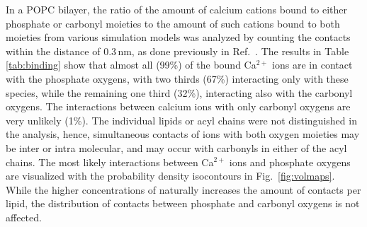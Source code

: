 \documentclass[aip,jcp,twocolumn]{revtex4}
\begin{document}
In a POPC bilayer, the ratio of the amount of calcium cations 
bound to either phosphate or carbonyl moieties 
to the amount of such cations bound to both moieties
from various simulation models
was analyzed by counting the contacts within the distance of $0.3 \, \mathrm{nm}$, 
as done previously in Ref.~. 
%
%
%
The results in Table \ref{tab:binding} show that almost all (99\%) of the 
bound Ca$^{2+}$ ions are in contact with the phosphate oxygens,
with two thirds (67\%) interacting only with these species,
while the remaining one third (32\%), interacting also with the carbonyl oxygens. 
The interactions between
calcium ions with only carbonyl oxygens are very unlikely (1\%).
The individual lipids or acyl chains were not distinguished in the analysis,
hence, simultaneous contacts of ions with both oxygen moieties may be inter or intra molecular,
and may occur with carbonyls in either of the acyl chains.
The most likely interactions between Ca$^{2+}$ ions and phosphate oxygens are visualized with
the probability density isocontours in Fig.~\ref{fig:volmaps}.
While the higher concentrations of  naturally increases the amount of contacts per lipid,
the distribution of contacts between phosphate and carbonyl oxygens is not affected.
\end{document}
